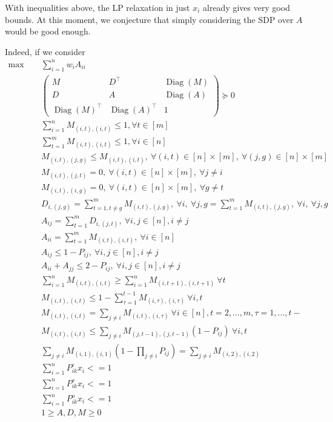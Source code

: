 \documentclass{article}
\newcommand{\Diag}{\operatorname{Diag}}
\begin{document}

With inequalities above, the LP relaxation in just $x_i$ already gives very good bounds.
At this moment, we conjecture that simply considering the SDP over $A$ would be good enough.


Indeed, if we consider 
\begin{align*}
    \max\quad~&\sum_{i=1}^{n}w_iA_{ii}\\
    &\begin{pmatrix}
        M & D^\top &\Diag(M)\\
        D & A &\Diag(A)\\
        \Diag(M)^\top &\Diag(A)^\top &1
    \end{pmatrix}\succeq 0\\
    &\sum_{i=1}^{n}M_{(i,t),(i,t)} \leq 1,\forall t\in[m]\\
    &\sum_{t=1}^{m}M_{(i,t),(i,t)} \leq 1,\forall i\in[n]\\
    &M_{(i,t),(j,g)}\leq M_{(i,t),(i,t)},~\forall (i,t)\in [n]\times [m],~\forall (j,g)\in [n]\times [m]\\
    &M_{(i,t),(j,t)}=0,~\forall (i,t)\in [n]\times [m],~\forall j\neq i\\
    &M_{(i,t),(i,g)}=0,~\forall (i,t)\in [n]\times [m],~\forall g\neq t\\
    &D_{i,(j,g)} = \sum_{t=1,t\neq g}^{m}M_{(i,t),(j,g)},~\forall i,~\forall j,g = \sum_{t=1}^{m}M_{(i,t),(j,g)},~\forall i,~\forall j,g\\
    &A_{ij}=\sum_{t=1}^{m}D_{i,(j,t)},~\forall i,j\in [n], i\neq j\\
    &A_{ii}=\sum_{t=1}^{m}M_{(i,t),(i,t)},~\forall i\in[n]\\
    &A_{ij}\leq 1-P_{ij},~\forall i,j\in [n], i\neq j\\
    &A_{ii}+A_{jj}\leq 2-P_{ij},~\forall i,j\in [n], i\neq j\\
    &\sum_{i=1}^{n}M_{(i,t),(i,t)}\geq\sum_{i=1}^{n}M_{(i,t+1),(i,t+1)}~\forall t\\
    & M_{(i,t),(i,t)}\leq 1-\sum_{\tau = 1}^{t-1}M_{(i,\tau),(i,\tau)}~\forall i,t\\
    &M_{(i,t),(i,t)} = \sum_{j\neq i}M_{(i,t),(i,\tau)}~\forall i\in[n],t = 2,\ldots,m, \tau = 1,\ldots,t-\\
    &M_{(i,t),(i,t)}\leq \sum_{j\neq i}M_{(j,t-1),(j,t-1)}(1-P_{ij})~\forall i,t\\
    &\sum_{j\neq i}M_{(i,1),(i,1)}(1-\prod_{j\neq i}P_{ij}) = \sum_{j\neq i}M_{(i,2),(i,2)}\\
    & \sum_{i=1}^{n}P_{ik}^e x_i<=1\\
    & \sum_{i=1}^{n}P_{ik}^s x_i<=1\\
    & \sum_{i=1}^{n}P_{ik}^o x_i<=1\\
    &1\geq A,D,M\geq 0
\end{align*}
\end{document}

